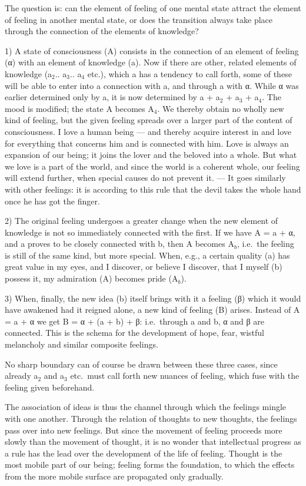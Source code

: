 \documentclass[12pt,a4paper]{book}
\newcommand{\opage}[1]{\marginnote{\footnotesize\textit{[#1]}}}
\begin{document}
The question is: can the element of feeling of one mental state attract
the element of feeling in another mental state, or does the transition
always take place through the connection of the elements of knowledge?

1) A state of consciousness (A) consists in the connection of an element
of feeling (α) with an element of knowledge (a). Now if there are other,
related elements of knowledge (a$_{2}$.. a$_{3}$.. a$_{4}$ etc.), which
a has a tendency to call forth, some of these will be able to enter into
a connection with a, and through a with α. While α was earlier
determined only by a, it is now determined by a + a$_{2}$ + a$_{3}$ +
a$_{4}$. The mood is modified; the state A becomes A$_{4}$. We thereby
obtain no wholly new kind of feeling, but the given feeling spreads over
a larger part of the content of consciousness. I love a human being ---
and thereby acquire interest in and love for everything that concerns
him and is connected with him. Love is always an expansion of our being;
it joins the lover and the beloved into a whole. But what we love is a
part of the world, and since the world is a coherent whole, our feeling
will extend further, when special causes do not prevent it. --- It goes
similarly with other feelings: it is according to this rule that the
devil takes the whole hand once he has got the finger.


\opage{290}2) The original feeling undergoes a greater change when the
new element of knowledge is not so immediately connected with the first.
If we have A = a + α, and a proves to be closely connected with b, then
A becomes A$_{b}$, i.e.\ the feeling is still of the same kind, but more
special. When, e.g., a certain quality (a) has great value in my eyes,
and I discover, or believe I discover, that I myself (b) possess it, my
admiration (A) becomes pride (A$_{b}$).

3) When, finally, the new idea (b) itself brings with it a feeling (β)
which it would have awakened had it reigned alone, a new kind of feeling
(B) arises. Instead of A = a + α we get B = α + (a + b) + β: i.e.\
through a and b, α and β are connected. This is the schema for the
development of hope, fear, wistful melancholy and similar composite
feelings.

No sharp boundary can of course be drawn between these three cases,
since already a$_{2}$ and a$_{3}$ etc.\ must call forth new nuances of
feeling, which fuse with the feeling given beforehand.

The association of ideas is thus the channel through which the feelings
mingle with one another. Through the relation of thoughts to new
thoughts, the feelings pass over into new feelings. But since the
movement of feeling proceeds more slowly than the movement of thought, it
is no wonder that intellectual progress as a rule has the lead over the
development of the life of feeling. Thought is the most mobile part of
our being; feeling forms the foundation, to which the effects from the
more mobile surface are propagated only gradually.
\end{document}
